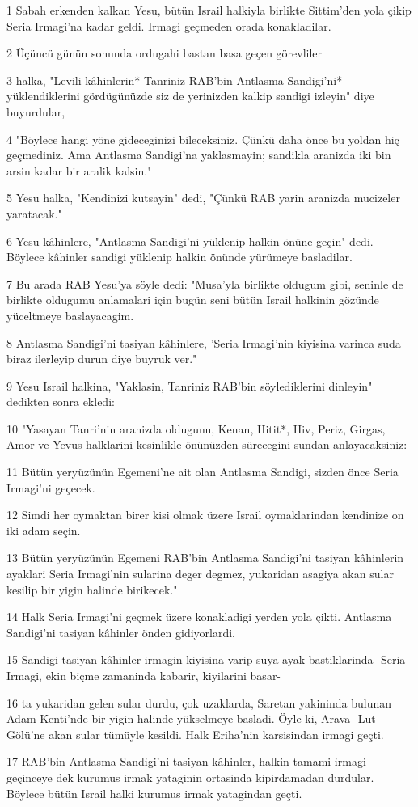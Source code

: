 \par 1 Sabah erkenden kalkan Yesu, bütün Israil halkiyla birlikte Sittim'den yola çikip Seria Irmagi'na kadar geldi. Irmagi geçmeden orada konakladilar.
\par 2 Üçüncü günün sonunda ordugahi bastan basa geçen görevliler
\par 3 halka, "Levili kâhinlerin* Tanriniz RAB'bin Antlasma Sandigi'ni* yüklendiklerini gördügünüzde siz de yerinizden kalkip sandigi izleyin" diye buyurdular,
\par 4 "Böylece hangi yöne gideceginizi bileceksiniz. Çünkü daha önce bu yoldan hiç geçmediniz. Ama Antlasma Sandigi'na yaklasmayin; sandikla aranizda iki bin arsin kadar bir aralik kalsin."
\par 5 Yesu halka, "Kendinizi kutsayin" dedi, "Çünkü RAB yarin aranizda mucizeler yaratacak."
\par 6 Yesu kâhinlere, "Antlasma Sandigi'ni yüklenip halkin önüne geçin" dedi. Böylece kâhinler sandigi yüklenip halkin önünde yürümeye basladilar.
\par 7 Bu arada RAB Yesu'ya söyle dedi: "Musa'yla birlikte oldugum gibi, seninle de birlikte oldugumu anlamalari için bugün seni bütün Israil halkinin gözünde yüceltmeye baslayacagim.
\par 8 Antlasma Sandigi'ni tasiyan kâhinlere, 'Seria Irmagi'nin kiyisina varinca suda biraz ilerleyip durun diye buyruk ver."
\par 9 Yesu Israil halkina, "Yaklasin, Tanriniz RAB'bin söylediklerini dinleyin" dedikten sonra ekledi:
\par 10 "Yasayan Tanri'nin aranizda oldugunu, Kenan, Hitit*, Hiv, Periz, Girgas, Amor ve Yevus halklarini kesinlikle önünüzden sürecegini sundan anlayacaksiniz:
\par 11 Bütün yeryüzünün Egemeni'ne ait olan Antlasma Sandigi, sizden önce Seria Irmagi'ni geçecek.
\par 12 Simdi her oymaktan birer kisi olmak üzere Israil oymaklarindan kendinize on iki adam seçin.
\par 13 Bütün yeryüzünün Egemeni RAB'bin Antlasma Sandigi'ni tasiyan kâhinlerin ayaklari Seria Irmagi'nin sularina deger degmez, yukaridan asagiya akan sular kesilip bir yigin halinde birikecek."
\par 14 Halk Seria Irmagi'ni geçmek üzere konakladigi yerden yola çikti. Antlasma Sandigi'ni tasiyan kâhinler önden gidiyorlardi.
\par 15 Sandigi tasiyan kâhinler irmagin kiyisina varip suya ayak bastiklarinda -Seria Irmagi, ekin biçme zamaninda kabarir, kiyilarini basar-
\par 16 ta yukaridan gelen sular durdu, çok uzaklarda, Saretan yakininda bulunan Adam Kenti'nde bir yigin halinde yükselmeye basladi. Öyle ki, Arava -Lut- Gölü'ne akan sular tümüyle kesildi. Halk Eriha'nin karsisindan irmagi geçti.
\par 17 RAB'bin Antlasma Sandigi'ni tasiyan kâhinler, halkin tamami irmagi geçinceye dek kurumus irmak yataginin ortasinda kipirdamadan durdular. Böylece bütün Israil halki kurumus irmak yatagindan geçti.

